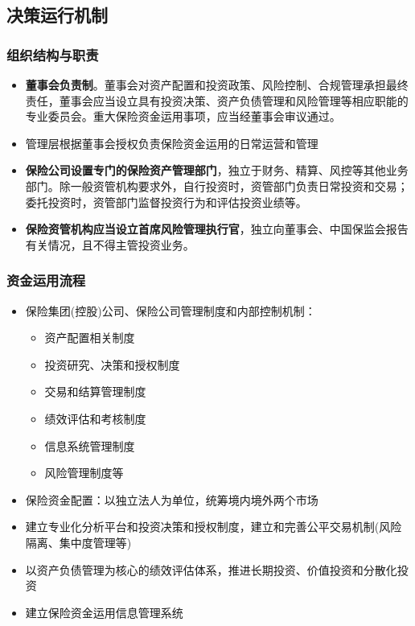 \documentclass[a4paper,12pt]{ctexbeamer}
\begin{document}
\subsection{决策运行机制}
\begin{frame}
    \frametitle{组织结构与职责}
    \begin{itemize}
        \item \textbf{董事会负责制}。董事会对资产配置和投资政策、风险控制、合规管理承担最终责任，董事会应当设立具有投资决策、资产负债管理和风险管理等相应职能的专业委员会。重大保险资金运用事项，应当经董事会审议通过。
        \item 管理层根据董事会授权负责保险资金运用的日常运营和管理
        \item \textbf{保险公司设置专门的保险资产管理部门}，独立于财务、精算、风控等其他业务部门。除一般资管机构要求外，自行投资时，资管部门负责日常投资和交易；委托投资时，资管部门监督投资行为和评估投资业绩等。
        \item \textbf{保险资管机构应当设立首席风险管理执行官}，独立向董事会、中国保监会报告有关情况，且不得主管投资业务。
    \end{itemize}
\end{frame}
\begin{frame}
    \frametitle{资金运用流程}
    \begin{itemize}
        \item 保险集团(控股)公司、保险公司管理制度和内部控制机制：
              \begin{itemize}
                  \item 资产配置相关制度
                  \item 投资研究、决策和授权制度
                  \item 交易和结算管理制度
                  \item 绩效评估和考核制度
                  \item 信息系统管理制度
                  \item 风险管理制度等
              \end{itemize}
        \item 保险资金配置：以独立法人为单位，统筹境内境外两个市场
        \item 建立专业化分析平台和投资决策和授权制度，建立和完善公平交易机制(风险隔离、集中度管理等)
        \item 以资产负债管理为核心的绩效评估体系，推进长期投资、价值投资和分散化投资
        \item 建立保险资金运用信息管理系统
    \end{itemize}
\end{frame}
\end{document}
